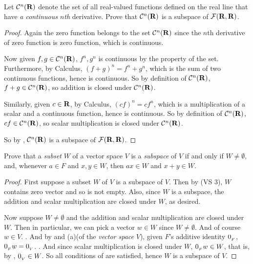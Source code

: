 \begin{exercise} \label{exercise 1.3.16}
Let \(\mathcal{C}^n(\mathbf{R})\) denote the set of all real-valued functions defined on the real line that have \emph{a continuous \(n\)th} derivative.
Prove that \(\mathcal{C}^n(\mathbf{R})\) is a subspace of \(\mathcal{F}(\mathbf{R}, \mathbf{R})\).
\end{exercise}

\begin{proof}
Again the zero function belongs to the set \(\mathcal{C}^n(\mathbf{R})\) since the \(n\)th derivative of zero function is zero function, which is continuous.

Now given \(f, g \in \mathcal{C}^n(\mathbf{R})\), \(f^n, g^n\) is continuous by the property of the set.
Furthermore, by Calculus, \((f + g)^n = f^n + g^n\), which is the sum of two continuous functions, hence is continuous.
So by definition of \(\mathcal{C}^n(\mathbf{R})\), \(f + g \in \mathcal{C}^n(\mathbf{R})\), so addition is closed under \(\mathcal{C}^n(\mathbf{R})\).

Similarly, given \(c \in \mathbf{R}\), by Calculus, \((cf)^n = cf^n\), which is a multiplication of a scalar and a continuous function, hence is continuous.
So by definition of \(\mathcal{C}^n(\mathbf{R})\), \(cf \in \mathcal{C}^n(\mathbf{R})\), so scalar multiplication is closed under \(\mathcal{C}^n(\mathbf{R})\).

So by , \(\mathcal{C}^n(\mathbf{R})\) is a subspace of \(\mathcal{F}(\mathbf{R}, \mathbf{R})\).
\end{proof}

\begin{exercise} \label{exercise 1.3.17}
Prove that a \emph{subset} \(W\) of a vector space \(V\) is a \emph{subspace} of \(V\) if and only if \(W \ne \emptyset\), and, whenever \(a \in F\) and \(x, y \in W\), then \(ax \in W\) and \(x + y \in W\).
\end{exercise}

\begin{proof}
First suppose a subset \(W\) of \(V\) is a subspace of \(V\).
Then by (VS 3), \(W\) contains zero vector and so is not empty.
Also, since \(W\) is a subspace, the addition and scalar multiplication are closed under \(W\), as desired.

Now suppose \(W \ne \emptyset\) and the addition and scalar multiplication are closed under \(W\).
Then in particular, we can pick a vector \(w \in W\) since \(W \ne \emptyset\).
And of course \(w \in V\). .
And by  and (a)(of the \emph{vector space} \(V\)), given \(F\)'s additive identity \(0_{_F}\), \(0_{_F} w = 0_{_V}\). .
And since scalar multiplication is closed under \(W\), \(0_{_F} w \in W\), that is, by , \(0_{_V} \in W\).
So all conditions of  are satisfied, hence \(W\) is a subspace of \(V\).
\end{proof}

